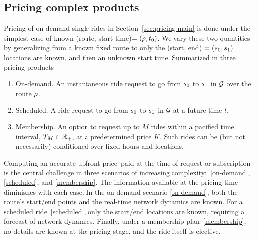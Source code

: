 \documentclass[12pt]{article}
\begin{document}
{{{{{{{\subsection{Pricing complex products}\label{sec:complex-pricing}
Pricing of on-demand single rides in Section~\ref{sec:pricing-main} is done under the simplest case of known (route, start time)$=(\rho, t_0)$. We vary these two quantities by generalizing from a known fixed route to only the (start, end) $=\left({s_0}, { s_1}\right)$ locations are known, and then an unknown start time. Summarized in three pricing products
\begin{enumerate}[label={(P$_{\arabic*})$}, ref={(P$_{\arabic*}$)}] 
    \item On-demand. An instantaneous ride request to go from  ${s_0}$ to ${ s_1}$ in $\mathcal{G}$ over the route $\rho$. \label{on-demand}
    \item Scheduled. A ride request to go from ${s_0}$ to ${ s_1}$ in $\mathcal{G}$ at a future time $t$. \label{scheduled}
    \item Membership. An option to request up to $M$ rides within a pacified time interval, $T_M \in \mathbb{R}_+$, at a predetermined price $K$. Such rides can be (but not necessarily) conditioned over fixed hours and locations.  \label{membership}
\end{enumerate}

Computing an accurate upfront price--paid at the time of request or subscription--is the central challenge in three scenarios of increasing complexity:~\ref{on-demand}, \ref{scheduled}, and \ref{membership}. The information available at the pricing time diminishes with each case. In the on-demand scenario \ref{on-demand}, both the route's start/end points and the real-time network dynamics are known. For a scheduled ride~\ref{scheduled}, only the start/end locations are known, requiring a forecast of network dynamics. Finally, under a membership plan~\ref{membership}, no details are known at the pricing stage, and the ride itself is elective. 

}}}}}}}
\end{document}

